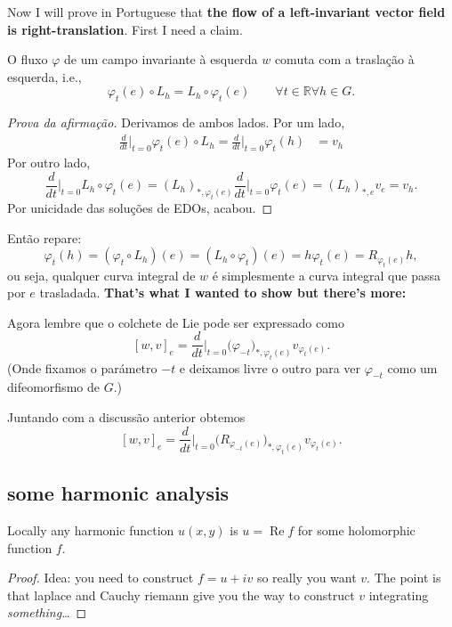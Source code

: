 Now I will prove in Portuguese that \textbf{the flow of a left-invariant vector field is right-translation}. First I need a claim.

	\begin{claim}\leavevmode
	O fluxo \(\varphi\) de um campo invariante à esquerda \(w\) comuta com a traslação à esquerda, i.e.,
	\[\varphi_t(e)\circ L_h = L_h \circ \varphi_t(e)\qquad \forall t\in \mathbb{R} \forall h \in G.\]
	\end{claim}
	\begin{proof}[Prova da afirmação]\leavevmode
Derivamos de ambos lados. Por um lado,
\begin{align*}
\frac{d}{dt}\Big|_{t=0}\varphi_t(e) \circ L_h=\frac{d}{dt}\Big|_{t=0}\varphi_t(h)&=v_h\end{align*}
Por outro lado,
\[\frac{d}{dt}\Big|_{t=0}L_h \circ \varphi_t(e)=(L_h)_{*,\varphi_t(e)}\frac{d}{dt}\Big|_{t=0}\varphi_t(e)=(L_h)_{*,e}v_e=v_h.\]
Por unicidade das soluções de EDOs, acabou.
	\end{proof}
Então repare:
\[\varphi_t(h)=(\varphi_t\circ L_h)(e)=(L_h \circ \varphi_t)(e)=h\varphi_t(e)=R_{\varphi_t(e)}h,\]
ou seja, qualquer curva integral de \(w\) é simplesmente a curva integral que passa por \(e\) trasladada. \textbf{That's what I wanted to show but there's more:} 

Agora lembre que o colchete de Lie pode ser expressado como
\[[w,v]_e=\frac{d}{dt}\Big|_{t=0}\Big(\varphi_{-t}\Big)_{*,\varphi_t(e)}v_{\varphi_t(e)}.\]
(Onde fixamos o parámetro \(-t\) e deixamos livre o outro para ver \(\varphi_{-t}\) como um difeomorfismo de \(G\).)

Juntando com a discussão anterior obtemos
\[[w,v]_e=\frac{d}{dt}\Big|_{t=0}\Big(R_{\varphi_{-t}(e)}\Big)_{*,\varphi_t(e)}v_{\varphi_t(e)}.\]

\subsection{some harmonic analysis}

\begin{claim}\leavevmode
Locally any harmonic function \(u(x,y)\) is \(u=\operatorname{Re}f\) for some holomorphic function \(f\).
\end{claim}

\begin{proof}\leavevmode
Idea: you need to construct \(f=u+iv\) so really you want  \(v\). The point is that laplace and Cauchy riemann give you the way to construct \(v\) integrating \textit{something}…
\end{proof}


